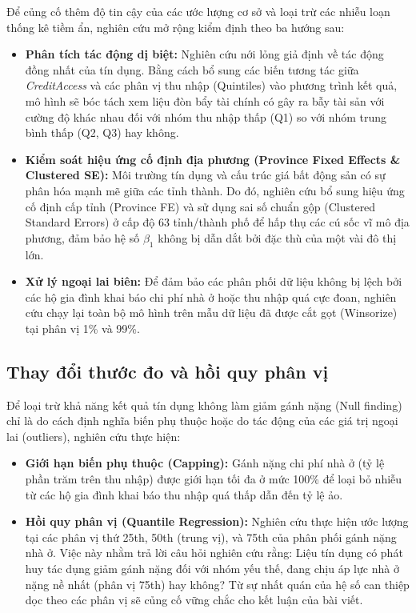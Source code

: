 \documentclass[12pt,a4paper]{report}
\begin{document}
Để củng cố thêm độ tin cậy của các ước lượng cơ sở và loại trừ các nhiễu loạn thống kê tiềm ẩn, nghiên cứu mở rộng kiểm định theo ba hướng sau:
\begin{itemize}
	
	\item \textbf{Phân tích tác động dị biệt:} Nghiên cứu nới lỏng giả định về tác động đồng nhất của tín dụng. Bằng cách bổ sung các biến tương tác giữa \textit{CreditAccess} và các phân vị thu nhập (Quintiles) vào phương trình kết quả, mô hình sẽ bóc tách xem liệu đòn bẩy tài chính có gây ra bẫy tài sản với cường độ khác nhau đối với nhóm thu nhập thấp (Q1) so với nhóm trung bình thấp (Q2, Q3) hay không.
	
	\item \textbf{Kiểm soát hiệu ứng cố định địa phương (Province Fixed Effects \& Clustered SE):} Môi trường tín dụng và cấu trúc giá bất động sản có sự phân hóa mạnh mẽ giữa các tỉnh thành. Do đó, nghiên cứu bổ sung hiệu ứng cố định cấp tỉnh (Province FE) và sử dụng sai số chuẩn gộp (Clustered Standard Errors) ở cấp độ 63 tỉnh/thành phố để hấp thụ các cú sốc vĩ mô địa phương, đảm bảo hệ số $\beta_1$ không bị dẫn dắt bởi đặc thù của một vài đô thị lớn.
	
	\item \textbf{Xử lý ngoại lai biên:} Để đảm bảo các phân phối dữ liệu không bị lệch bởi các hộ gia đình khai báo chi phí nhà ở hoặc thu nhập quá cực đoan, nghiên cứu chạy lại toàn bộ mô hình trên mẫu dữ liệu đã được cắt gọt (Winsorize) tại phân vị 1\% và 99\%.
	
\end{itemize}

\subsection{Thay đổi thước đo và hồi quy phân vị}
Để loại trừ khả năng kết quả tín dụng không làm giảm gánh nặng (Null finding) chỉ là do cách định nghĩa biến phụ thuộc hoặc do tác động của các giá trị ngoại lai (outliers), nghiên cứu thực hiện:
\begin{itemize}
	\item \textbf{Giới hạn biến phụ thuộc (Capping):} Gánh nặng chi phí nhà ở (tỷ lệ phần trăm trên thu nhập) được giới hạn tối đa ở mức 100\% để loại bỏ nhiễu từ các hộ gia đình khai báo thu nhập quá thấp dẫn đến tỷ lệ ảo.
	\item \textbf{Hồi quy phân vị (Quantile Regression):} Nghiên cứu thực hiện ước lượng tại các phân vị thứ 25th, 50th (trung vị), và 75th của phân phối gánh nặng nhà ở. Việc này nhằm trả lời câu hỏi nghiên cứu rằng: Liệu tín dụng có phát huy tác dụng giảm gánh nặng đối với nhóm yếu thế, đang chịu áp lực nhà ở nặng nề nhất (phân vị 75th) hay không? Từ sự nhất quán của hệ số can thiệp dọc theo các phân vị sẽ củng cố vững chắc cho kết luận của bài viết.
\end{itemize}
\end{document}
